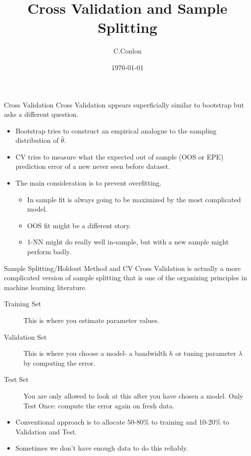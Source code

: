 \documentclass[aspectratio=169]{beamer}
\title [Bootstrap]{ Cross Validation and Sample Splitting}
\author{C.Conlon}
\institute{Applied Econometrics II}
\date{\today}
\begin{document}
\begin{frame}
\titlepage
\end{frame}



\begin{frame}{Cross Validation}
Cross Validation appears superficially similar to bootstrap but asks a different question.
\begin{itemize}
\item Bootstrap tries to construct an empirical analogue to the sampling distribution of $\hat{\theta}$.
\item CV tries to measure what the expected out of sample (OOS or EPE) prediction error of a new never seen before dataset.
\item The main consideration is to prevent \alert{overfitting}.
\begin{itemize}
\item In sample fit is always going to be maximized by the most complicated model.
\item OOS fit might be a different story.
\item 1-NN might do really well in-sample, but with a new sample might perform badly.
\end{itemize}
\end{itemize}
\end{frame}

\begin{frame}{Sample Splitting/Holdout Method and CV}
Cross Validation is actually a more complicated version of \alert{sample splitting} that is one of the organizing principles in machine learning literature.

\begin{description}
\item[Training Set] This is where you estimate parameter values.
\item[Validation Set] This is where you choose a model- a bandwidth $h$ or tuning parameter $\lambda$ by computing the error.
\item[Test Set] You are only allowed to look at this after you have chosen a model. \alert{Only Test Once}: compute the error again on fresh data.
\end{description}
\begin{itemize}
\item Conventional approach is to allocate 50-80\% to training and 10-20\% to Validation and Test.
\item Sometimes we don't have enough data to do this reliably.
\end{itemize}
\end{frame}
\end{document}
